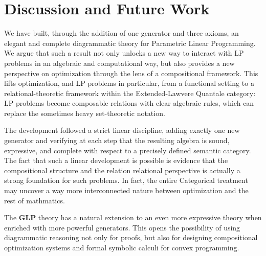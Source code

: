 \section{Discussion and Future Work}

We have built, through the addition of one generator and three axioms,
an elegant and complete diagrammatic theory for Parametric Linear Programming.
We argue that such a result not only unlocks a new way to interact with LP problems in an algebraic
and computational way, but also provides a new perspective on optimization through the lens of
a compositional framework. This lifts optimization, and LP problems in particular, from a functional setting to a relational-theoretic framework within the Extended-Lawvere Quantale category: LP problems become composable relations with clear algebraic rules, which can replace the sometimes heavy set-theoretic notation.

The development followed a strict linear discipline, adding exactly one new
generator and verifying at each step that the resulting algebra is
sound, expressive, and complete with respect to a precisely defined semantic
category. The fact that such a linear development is
possible is evidence that the
compositional structure and the relation relational perspective
is actually a strong foundation for such problems. In fact, the entire Categorical treatment
may uncover a way more interconnected nature between optimization and the rest
of mathmatics.

The $\mathbf{GLP}$ theory has a natural extension to an even more expressive theory
when enriched with more powerful generators. This opens the possibility of using diagrammatic reasoning not
only for proofs, but also for designing compositional 
optimization systems and formal symbolic calculi for
convex programming.
